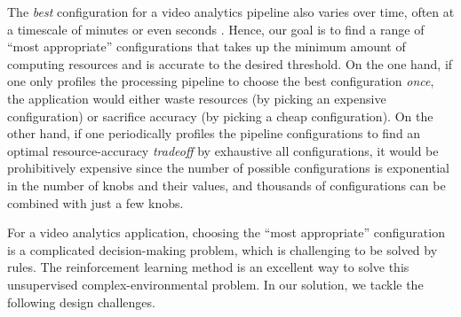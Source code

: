 The \emph{best} configuration for a video analytics pipeline also varies over time, often at a timescale of minutes or even seconds \cite{jiang2018chameleon}. Hence, our goal is to find a range of ``most appropriate'' configurations that takes up the minimum amount of computing resources and is accurate to the desired threshold. On the one hand, if one only profiles the processing pipeline to choose the best configuration \emph{once}, the application would either waste resources (by picking an expensive configuration) or sacrifice accuracy (by picking a cheap configuration). On the other hand, if one periodically profiles the pipeline configurations to find an optimal resource-accuracy \emph{tradeoff} by exhaustive all configurations, it would be prohibitively expensive since the number of possible configurations is exponential in the number of knobs and their values, and thousands of configurations can be combined with just a few knobs.


For a video analytics application, choosing the ``most appropriate'' configuration is a complicated decision-making problem, which is challenging to be solved by rules. The reinforcement learning method is an excellent way to solve this unsupervised complex-environmental problem. In our solution, we tackle the following design challenges.


